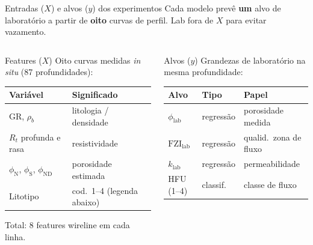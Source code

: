 \documentclass[aspectratio=169,10pt]{beamer}
\newcommand{\philab}{\ensuremath{\phi_{\mathrm{lab}}}}
\newcommand{\fzilab}{\ensuremath{\mathrm{FZI}_{\mathrm{lab}}}}
\newcommand{\klab}{\ensuremath{k_{\mathrm{lab}}}}
\newcommand{\phiND}{\ensuremath{\phi_{\mathrm{ND}}}}
\begin{document}
\begin{frame}{Entradas ($X$) e alvos ($y$) dos experimentos}
  \footnotesize
  Cada modelo prevê \textbf{um} alvo de laboratório a partir de
  \textbf{oito} curvas de perfil. Lab fora de $X$ para evitar vazamento.
  \vspace{0.06cm}
  \setlength{\columnsep}{0.05\textwidth}
  \begin{columns}[T,onlytextwidth]
    \begin{block}{Features ($X$)}
      \scriptsize
      Oito curvas medidas \emph{in situ} (87 profundidades):
      \vspace{0.04cm}
      \centering
      \setlength{\tabcolsep}{3pt}
      \renewcommand{\arraystretch}{1.05}
      \begin{tabular}{@{}>{\raggedright\arraybackslash}p{1.65cm}>{\raggedright\arraybackslash}p{2.45cm}@{}}
        \toprule
        Variável & Significado \\
        \midrule
        GR, $\rho_b$ & litologia / densidade \\
        $R_t$ profunda e rasa & resistividade \\
        $\phi_{\mathrm{N}}$, $\phi_{\mathrm{S}}$, \phiND{} & porosidade estimada \\
        Litotipo & cod.\ 1--4 (legenda abaixo) \\
        \bottomrule
      \end{tabular}
      \vspace{0.04cm}

      {\scriptsize Total: 8 features wireline em cada linha.}
    \end{block}
    \begin{block}{Alvos ($y$)}
      \scriptsize
      Grandezas de laboratório na mesma profundidade:
      \vspace{0.04cm}
      \centering
      \setlength{\tabcolsep}{3pt}
      \renewcommand{\arraystretch}{1.05}
      \begin{tabular}{@{}>{\raggedright\arraybackslash}p{1.0cm}>{\raggedright\arraybackslash}p{0.9cm}>{\raggedright\arraybackslash}p{2.2cm}@{}}
        \toprule
        Alvo & Tipo & Papel \\
        \midrule
        \philab & regressão & porosidade medida \\
        \fzilab & regressão & qualid.\ zona de fluxo \\
        \klab & regressão & permeabilidade \\
        HFU (1--4) & classif. & classe de fluxo \\
        \bottomrule
      \end{tabular}
      \vspace{0.04cm}


\end{block}
\end{columns}
\end{frame}
\end{document}
